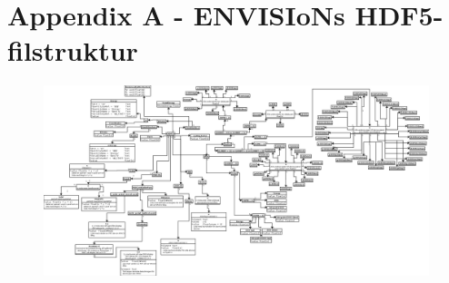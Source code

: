 \newpage
\section{Appendix A - ENVISIoNs HDF5-filstruktur} \label{sec:appendixHDF5}
\begin{figure}[H]
  \centering
 \includegraphics[angle=270,scale=0.26]{images/UPDATE-hdf5-dataformat3modi.png}
\end{figure}
\newpage
